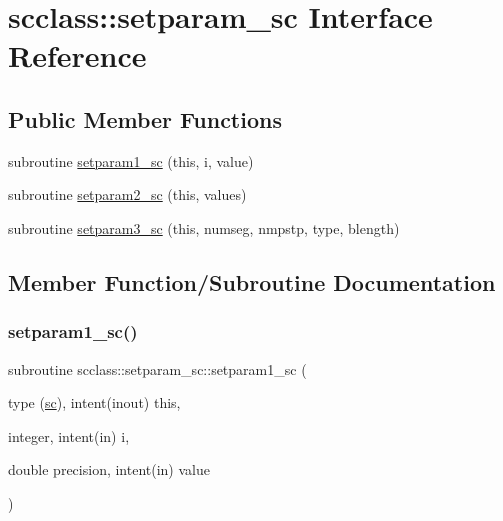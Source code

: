 \hypertarget{interfacescclass_1_1setparam__sc}{}\section{scclass\+::setparam\+\_\+sc Interface Reference}
\label{interfacescclass_1_1setparam__sc}
\subsection*{Public Member Functions}
\begin{DoxyCompactItemize}
\item 
subroutine \mbox{\hyperlink{interfacescclass_1_1setparam__sc_a80e02bb5de4d1af4c800c602fbbdc339}{setparam1\+\_\+sc}} (this, i, value)
\item 
subroutine \mbox{\hyperlink{interfacescclass_1_1setparam__sc_aaebddb22b2a1cb5da8e56c1ecae9e6f0}{setparam2\+\_\+sc}} (this, values)
\item 
subroutine \mbox{\hyperlink{interfacescclass_1_1setparam__sc_a5bc1451fdabb3a886b7335be9f8ab8e3}{setparam3\+\_\+sc}} (this, numseg, nmpstp, type, blength)
\end{DoxyCompactItemize}


\subsection{Member Function/\+Subroutine Documentation}
\mbox{\label{interfacescclass_1_1setparam__sc_a80e02bb5de4d1af4c800c602fbbdc339}} 
\subsubsection{\texorpdfstring{setparam1\_sc()}{setparam1\_sc()}}
{\footnotesize\ttfamily subroutine scclass\+::setparam\+\_\+sc\+::setparam1\+\_\+sc (\begin{DoxyParamCaption}\item[{type (\mbox{\hyperlink{namespacescclass_structscclass_1_1sc}{sc}}), intent(inout)}]{this,  }\item[{integer, intent(in)}]{i,  }\item[{double precision, intent(in)}]{value }\end{DoxyParamCaption})}

